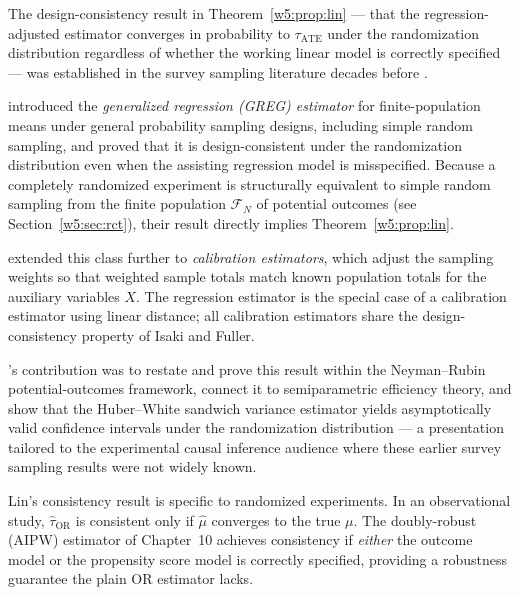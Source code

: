 \documentclass[master.tex]{subfiles}
\begin{document}
\begin{remark}
\label{w5:rem:lin-survey}
The design-consistency result in Theorem~\ref{w5:prop:lin} --- that the
regression-adjusted estimator converges in probability to
$\tau_{\mathrm{ATE}}$ under the randomization distribution regardless
of whether the working linear model is correctly specified --- was
established in the survey sampling literature decades before
\citet{lin2013agnostic}.

\citet{isaki1982survey} introduced the \emph{generalized regression
(GREG) estimator} for finite-population means under general probability
sampling designs, including simple random sampling, and proved that it
is design-consistent under the randomization distribution even when the
assisting regression model is misspecified.  Because a completely
randomized experiment is structurally equivalent to simple random
sampling from the finite population $\mathcal{F}_N$ of potential
outcomes (see Section~\ref{w5:sec:rct}), their result directly implies
Theorem~\ref{w5:prop:lin}.

\citet{deville1992calibration} extended this class further to
\emph{calibration estimators}, which adjust the sampling weights so
that weighted sample totals match known population totals for the
auxiliary variables $X$.  The regression estimator is the special case
of a calibration estimator using linear distance; all calibration
estimators share the design-consistency property of Isaki and Fuller.

\citet{lin2013agnostic}'s contribution was to restate and prove this
result within the Neyman--Rubin potential-outcomes framework, connect
it to semiparametric efficiency theory, and show that the
Huber--White sandwich variance estimator yields asymptotically valid
confidence intervals under the randomization distribution --- a
presentation tailored to the experimental causal inference audience
where these earlier survey sampling results were not widely known.
\end{remark}

\begin{remark}
Lin's consistency result is specific to randomized experiments.  In an
observational study, $\hat\tau_{\mathrm{OR}}$ is consistent only if
$\hat\mu$ converges to the true $\mu$.  The doubly-robust (AIPW)
estimator of Chapter~10 achieves consistency if \emph{either} the
outcome model or the propensity score model is correctly specified,
providing a robustness guarantee the plain OR estimator lacks.
\end{remark}
\end{document}
